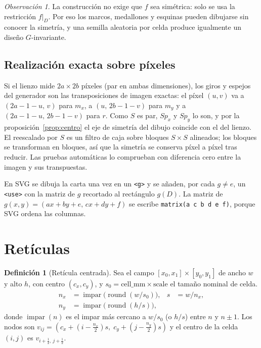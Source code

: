 \documentclass[11pt,a4paper]{article}
\theoremstyle{definition}
\newtheorem{definicion}{Definición}[section]
\theoremstyle{plain}
\theoremstyle{remark}
\newtheorem{observacion}{Observación}[section]
\begin{document}
\begin{observacion}
La construcción no exige que $f$ sea simétrica: solo se usa la restricción
$f|_D$. Por eso los marcos, medallones y esquinas pueden dibujarse sin conocer la
simetría, y una semilla aleatoria por celda produce igualmente un diseño
$G$-invariante.
\end{observacion}

\subsection{Realización exacta sobre píxeles}
Si el lienzo mide $2a\times2b$ píxeles (par en ambas dimensiones), los giros y
espejos del generador son las transposiciones de imagen exactas: el píxel
$(u,v)$ va a $(2a-1-u,\,v)$ para $m_x$, a $(u,\,2b-1-v)$ para $m_y$ y a
$(2a-1-u,\,2b-1-v)$ para $r$. Como $S$ es par, $Sp_x$ y $Sp_y$ lo son, y por la
proposición~\ref{prop:centro} el eje de simetría del dibujo coincide con el del
lienzo. El reescalado por $S$ es un filtro de caja sobre bloques $S\times S$
alineados; los bloques se transforman en bloques, así que la simetría se conserva
píxel a píxel tras reducir. Las pruebas automáticas lo comprueban con diferencia
cero entre la imagen y sus transpuestas.

En SVG se dibuja la carta una vez en un \texttt{<g>} y se añaden, por cada
$g\ne e$, un \texttt{<use>} con la matriz de $g$ recortado al rectángulo
$g(D)$. La matriz de $g(x,y)=(ax+by+e,\,cx+dy+f)$ se escribe
\texttt{matrix(a c b d e f)}, porque SVG ordena las columnas.

\section{Retículas}

\begin{definicion}[Retícula centrada]
Sea el campo $[x_0,x_1]\times[y_0,y_1]$ de ancho $w$ y alto $h$, con centro
$(c_x,c_y)$, y $s_0=\text{cell\_mm}\times\text{scale}$ el tamaño nominal de celda.
\begin{align*}
  n_x&=\operatorname{impar}\!\bigl(\operatorname{round}(w/s_0)\bigr), & s&=w/n_x,\\
  n_y&=\operatorname{impar}\!\bigl(\operatorname{round}(h/s)\bigr),
\end{align*}
donde $\operatorname{impar}(n)$ es el impar más cercano a $w/s_0$ (o $h/s$) entre
$n$ y $n\pm1$. Los nodos son $v_{ij}=(c_x+(i-\tfrac{n_x}{2})s,\;c_y+(j-\tfrac{n_y}{2})s)$
y el centro de la celda $(i,j)$ es $v_{i+\frac12,\,j+\frac12}$.
\end{definicion}
\end{document}
